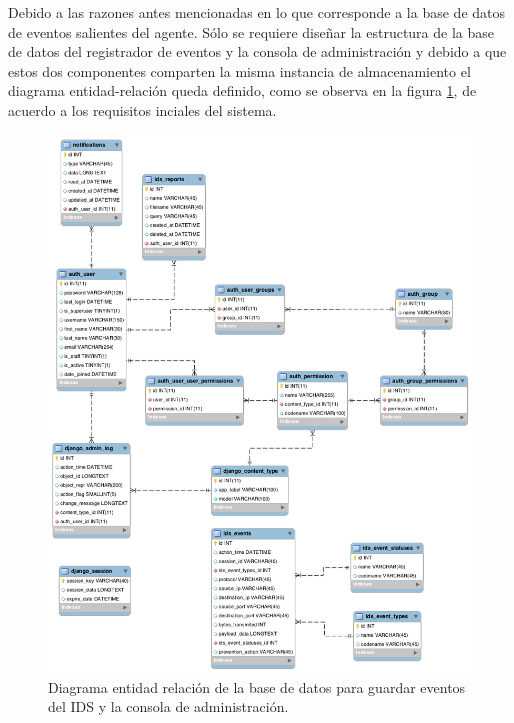 Debido a las razones antes mencionadas en lo que corresponde a la base de datos de eventos salientes del agente. Sólo se requiere diseñar la estructura de la base de datos del registrador de eventos y la consola de administración y debido a que estos dos componentes comparten la misma instancia de almacenamiento el diagrama entidad-relación queda definido, como se observa en la figura \ref{fig:ids_er}, de acuerdo a los requisitos inciales del sistema. \\

\begin{figure}
	\centering
	\includegraphics[scale=.4]{images/er_console_diagram}
	\caption{Diagrama entidad relación de la base de datos para guardar eventos del IDS y la consola de administración.}
	\label{fig:ids_er}
\end{figure}
